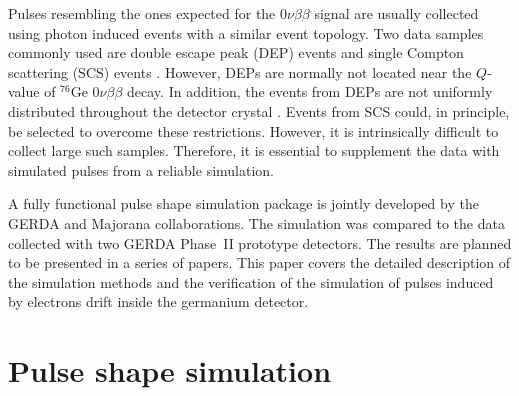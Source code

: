 \documentclass[epj]{svjour}
\begin{document}
Pulses resembling the ones expected for the $0\nu\beta\beta$ signal
are usually collected using photon induced events with a similar event
topology. Two data samples commonly used are double escape peak (DEP)
events and single Compton scattering (SCS) events \cite{scs}.
However, DEPs are normally not located near the $Q$-value of $^{76}$Ge
$0\nu\beta\beta$ decay. In addition, the events from DEPs are not
uniformly distributed throughout the detector crystal
\cite{psam}. Events from SCS could, in principle, be selected to
overcome these restrictions. However, it is intrinsically difficult to
collect large such samples. Therefore, it is essential to supplement
the data with simulated pulses from a reliable simulation.

A fully functional pulse shape simulation package is jointly developed
by the GERDA and Majorana \cite{Gai03,Aal04} collaborations. The
simulation was compared to the data collected with two GERDA Phase~II
prototype detectors. The results are planned to be presented in a
series of papers. This paper covers the detailed description of the
simulation methods and the verification of the simulation of pulses
induced by electrons drift inside the germanium detector.

\section{Pulse shape simulation}
\label{s:pss}
\end{document}
